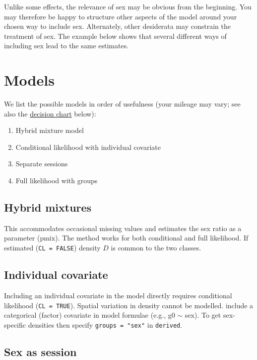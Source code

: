 \documentclass[
]{book}
\providecommand{\tightlist}{%
  \setlength{\itemsep}{0pt}\setlength{\parskip}{0pt}}
\begin{document}
Unlike some effects, the relevance of sex may be obvious from the beginning. You may therefore be happy to structure other aspects of the model around your chosen way to include sex. Alternately, other desiderata may constrain the treatment of sex. The example below shows that several different ways of including sex lead to the same estimates.

\section{Models}\label{models-1}

We list the possible models in order of usefulness (your mileage may vary; see also the \hyperref[decisionchart]{decision chart} below):

\begin{enumerate}
\def\labelenumi{\arabic{enumi}.}
\tightlist
\item
  Hybrid mixture model
\item
  Conditional likelihood with individual covariate
\item
  Separate sessions
\item
  Full likelihood with groups
\end{enumerate}

\subsection{Hybrid mixtures}\label{hybrid-mixtures-1}

This accommodates occasional missing values and estimates the sex ratio as a parameter (pmix). The method works for both conditional and full likelihood. If estimated (\texttt{CL\ =\ FALSE}) density \(D\) is common to the two classes.

\subsection{Individual covariate}\label{individual-covariate}

Including an individual covariate in the model directly requires conditional likelihood (\texttt{CL\ =\ TRUE}). Spatial variation in density cannot be modelled. include a categorical (factor) covariate in model formulae (e.g., g0 \(\sim\)
sex). To get sex-specific densities then specify \texttt{groups\ =\ "sex"} in \texttt{derived}.

\subsection{Sex as session}\label{sex-as-session}
\end{document}
